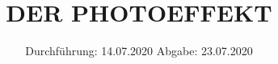 

\subject{V500}
\title{DER PHOTOEFFEKT}
\date{%
  Durchführung: 14.07.2020
  \hspace{3em}
  Abgabe: 23.07.2020
}



\maketitle
\thispagestyle{empty}
\tableofcontents
\newpage







\printbibliography{}



